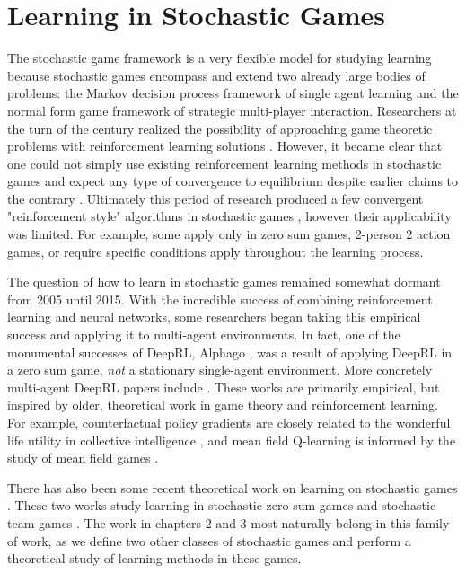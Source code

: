 \section{Learning in Stochastic Games}

The stochastic game framework is a very flexible model for studying learning because stochastic games encompass and extend two already large bodies of problems: the Markov decision process framework of single agent learning and the normal form game framework of strategic multi-player interaction. Researchers at the turn of the century realized the possibility of approaching game theoretic problems with reinforcement learning solutions \cite{littman1994markov, hu2003nash, bowling2001rational}. However, it became clear that one could not simply use existing reinforcement learning methods in stochastic games and expect any type of convergence to equilibrium \cite{bowling2000convergence} despite earlier claims to the contrary \cite{claus1998dynamics}. Ultimately this period of research produced a few convergent "reinforcement style" algorithms in stochastic games \cite{bowling2001rational, littman1994markov, hu2003nash, littman2001value}, however their applicability was limited. For example, some apply only in zero sum games, 2-person 2 action games, or require specific conditions apply throughout the learning process. 

The question of how to learn in stochastic games remained somewhat dormant from 2005 until 2015. With the incredible success of combining reinforcement learning and neural networks, some researchers began taking this empirical success and applying it to multi-agent environments. In fact, one of the monumental successes of DeepRL, Alphago \cite{silver2016mastering, alphazero}, was a result of applying DeepRL in a zero sum game, {\em not} a stationary single-agent environment. More concretely multi-agent DeepRL papers include \cite{foerster2018counterfactual, rashid2018qmix, balduzzi2018mechanics, yang2018mean, tampuu2017multiagent, omidshafiei2017deep, van2016coordinated, lowe2017multi}. These works are primarily empirical, but inspired by older, theoretical work in game theory and reinforcement learning. For example, counterfactual policy gradients \cite{foerster2018counterfactual} are closely related to the wonderful life utility in collective intelligence \cite{wolpert2002optimal}, and mean field Q-learning \cite{yang2018mean} is informed by the study of mean field games \cite{lasry2007mean}.

There has also been some recent theoretical work on learning on stochastic games \cite{zerosumstochastic, arslan2016decentralized}. These two works study learning in stochastic zero-sum games  \cite{zerosumstochastic} and stochastic team games \cite{arslan2016decentralized}. The work in chapters 2 and 3 most naturally belong in this family of work, as we define two other classes of stochastic games and perform a theoretical study of learning methods in these games.
